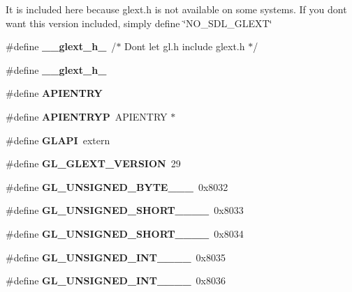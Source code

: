 It is included here because glext.\+h is not available on some systems. If you don\textquotesingle{}t want this version included, simply define \char`\"{}\+N\+O\+\_\+\+S\+D\+L\+\_\+\+G\+L\+E\+X\+T\char`\"{} \begin{DoxyCompactItemize}
\item 
\#define {\bfseries \+\_\+\+\_\+glext\+\_\+h\+\_\+}~/$\ast$ Don\textquotesingle{}t let gl.\+h include glext.\+h $\ast$/\label{_s_d_l__opengl_8h_af15549ea63f411c3ca673e7c6dc8acae}

\item 
\#define {\bfseries \+\_\+\+\_\+glext\+\_\+h\+\_\+}\label{_s_d_l__opengl_8h_af15549ea63f411c3ca673e7c6dc8acae}

\item 
\#define {\bfseries A\+P\+I\+E\+N\+T\+R\+Y}\label{_s_d_l__opengl_8h_a428a91acf2c2439dc1a257708ee1f805}

\item 
\#define {\bfseries A\+P\+I\+E\+N\+T\+R\+Y\+P}~A\+P\+I\+E\+N\+T\+R\+Y $\ast$\label{_s_d_l__opengl_8h_aef0d9e5e275e1b7becf54b6aa9ce3911}

\item 
\#define {\bfseries G\+L\+A\+P\+I}~extern\label{_s_d_l__opengl_8h_abad5ea874b73fa802c9ac0f5488bf9b5}

\item 
\#define {\bfseries G\+L\+\_\+\+G\+L\+E\+X\+T\+\_\+\+V\+E\+R\+S\+I\+O\+N}~29\label{_s_d_l__opengl_8h_ad37d7f259ec4a57d3cecee6932acb4ff}

\item 
\#define {\bfseries G\+L\+\_\+\+U\+N\+S\+I\+G\+N\+E\+D\+\_\+\+B\+Y\+T\+E\+\_\+\_\+\_}~0x8032\label{_s_d_l__opengl_8h_ad57d095154f5964429dc149add582257}

\item 
\#define {\bfseries G\+L\+\_\+\+U\+N\+S\+I\+G\+N\+E\+D\+\_\+\+S\+H\+O\+R\+T\+\_\+\_\+\_\+\_}~0x8033\label{_s_d_l__opengl_8h_ada3c99cc89e14622e4c62b911fda24fd}

\item 
\#define {\bfseries G\+L\+\_\+\+U\+N\+S\+I\+G\+N\+E\+D\+\_\+\+S\+H\+O\+R\+T\+\_\+\_\+\_\+\_}~0x8034\label{_s_d_l__opengl_8h_a654599021b9e26bd6feb4c7cd001ef7f}

\item 
\#define {\bfseries G\+L\+\_\+\+U\+N\+S\+I\+G\+N\+E\+D\+\_\+\+I\+N\+T\+\_\+\_\+\_\+\_}~0x8035\label{_s_d_l__opengl_8h_ac164b28463958d495e51702198e6d1cf}

\item 
\#define {\bfseries G\+L\+\_\+\+U\+N\+S\+I\+G\+N\+E\+D\+\_\+\+I\+N\+T\+\_\+\_\+\_\+\_}~0x8036\label{_s_d_l__opengl_8h_a57051f9ece699613fa17e87c9ec66910}


\end{DoxyCompactItemize}

